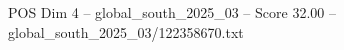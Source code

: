 \begin{textsample}{POS Dim 4 – global\_south\_2025\_03 – Score 32.00 – global\_south\_2025\_03/122358670.txt}
\end{textsample}
